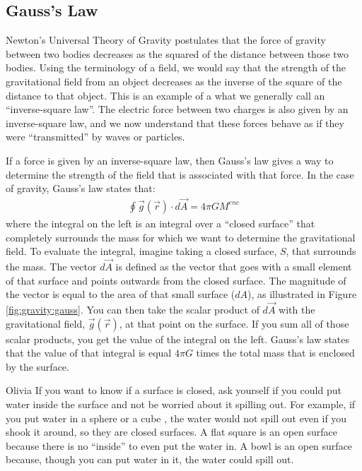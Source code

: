 \subsection{Gauss's Law}
\label{sec:gravity:gauss}
Newton's Universal Theory of Gravity postulates that the force of gravity between two bodies decreases as the squared of the distance between those two bodies. Using the terminology of a field, we would say that the strength of the gravitational field from an object decreases as the inverse of the square of the distance to that object. This is an example of a what we generally call an ``inverse-square law''. The electric force between two charges is also given by an inverse-square law, and we now understand that these forces behave as if they were ``transmitted'' by waves or particles.

If a force is given by an inverse-square law, then Gauss's law gives a way to determine the strength of the field that is associated with that force. In the case of gravity, Gauss's law states that:
\begin{align*}
\oint \vec g(\vec r) \cdot d\vec A = 4\pi G M^{enc}
\end{align*}
where the integral on the left is an integral over a ``closed surface'' that completely surrounds the mass for which we want to determine the gravitational field. To evaluate the integral, imagine taking a closed surface, $S$, that surrounds the mass. The vector $d\vec A$ is defined as the vector that goes with a small element of that surface and points outwards from the closed surface. The magnitude of the vector is equal to the area of that small surface ($dA$), as illustrated in Figure \ref{fig:gravity:gauss}. You can then take the scalar product of $d\vec A$ with the gravitational field, $\vec g(\vec r)$, at that point on the surface. If you sum all of those scalar products, you get the value of the integral on the left. Gauss's law states that the value of that integral is equal $4 \pi G$ times the total mass that is enclosed by the surface. 
\newpage
\begin{studentOpinion}{Olivia}
If you want to know if a surface is closed, ask yourself if you could put water inside the surface and not be worried about it spilling out. For example, if you put water in a sphere or a cube , the water would not spill out even if you shook it around, so they are closed surfaces. A flat square is an open surface because there is no ``inside'' to even put the water in.  A bowl is an open surface because, though you can put water in it, the water could spill out. 
\end{studentOpinion}
